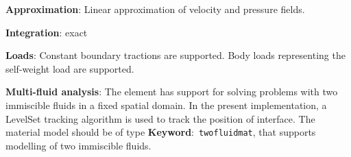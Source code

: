 \documentclass[a4paper]{article}
\newcommand{\descitem}[1]{{\noindent \textbf{#1}}:}
\newcommand{\elemkeyword}[1]{\descitem{Keyword}~\param{#1}} %
\newcommand{\param}[1]{\texttt{#1}} %
\begin{document}
\descitem{Approximation} Linear approximation of velocity and pressure
fields.

\descitem{Integration}
exact

\descitem{Loads} Constant boundary tractions are supported. Body loads
representing the self-weight load are supported.

\descitem{Multi-fluid analysis} The element has support for solving
problems with two immiscible fluids in
a fixed spatial domain. In the present implementation, a LevelSet tracking algorithm
is used to track the position of interface. 
The material model should be of type \elemkeyword{twofluidmat}, that
supports modelling of two immiscible fluids.

\printbibliography
\end{document}
